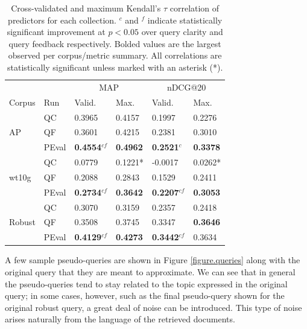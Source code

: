 \documentclass{sig-alternate}
\begin{document}
\begin{table}[t]
\centering
\begin{tabular}{|l|l|l|l|l|l|} \hline
& & \multicolumn{2}{c|}{MAP} & \multicolumn{2}{c|}{nDCG@20} \\ \cline{3-6}
Corpus & Run & Valid. & Max. & Valid. & Max. \\ \hline\hline
\multirow{3}{*}{AP} & QC & 0.3965 & 0.4157 & 0.1997 & 0.2276 \\ \cline{2-6}
& QF & 0.3601 & 0.4215 & 0.2381 & 0.3010 \\ \cline{2-6}
& PEval & \textbf{0.4554}$^{cf}$ & \textbf{0.4962} & \textbf{0.2521}$^{c}$ & \textbf{0.3378} \\ \hline\hline
\multirow{3}{*}{wt10g} & QC & 0.0779 & 0.1221* & -0.0017 & 0.0262*\\ \cline{2-6}
& QF & 0.2088 & 0.2843 & 0.1529 & 0.2411 \\ \cline{2-6}
& PEval & \textbf{0.2734}$^{cf}$ & \textbf{0.3642} & \textbf{0.2207}$^{cf}$ & \textbf{0.3053} \\ \hline\hline
\multirow{3}{*}{Robust} & QC & 0.3070 & 0.3159 & 0.2357 & 0.2418 \\ \cline{2-6}
& QF & 0.3508 & 0.3745 & 0.3347 & \textbf{0.3646} \\ \cline{2-6}
& PEval & \textbf{0.4129}$^{cf}$ & \textbf{0.4273} & \textbf{0.3442}$^{cf}$ & 0.3634 \\ \hline
\end{tabular}
\caption{Cross-validated and maximum Kendall's $\tau$ correlation of predictors for each collection. $^c$ and $^f$ indicate statistically significant improvement at $p < 0.05$ over query clarity and query feedback respectively. Bolded values are the largest observed per corpus/metric summary. All correlations are statistically significant unless marked with an asterisk (*).}
\label{table.results.self.kendall}
\end{table}

A few sample pseudo-queries are shown in Figure \ref{figure.queries} along with the original query that they are meant to approximate. We can see that in general the pseudo-queries tend to stay related to the topic expressed in the original query; in some cases, however, such as the final pseudo-query shown for the original robust query, a great deal of noise can be introduced. This type of noise arises naturally from the language of the retrieved documents.
\end{document}
